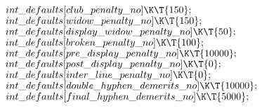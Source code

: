 ${}\index{int defaults+\\{int\_defaults}}\\{int\_defaults}[\index{club penalty no+\\{club\_penalty\_no}}\\{club\_penalty\_no}]\K\T{150};{}$\6
${}\index{int defaults+\\{int\_defaults}}\\{int\_defaults}[\index{widow penalty no+\\{widow\_penalty\_no}}\\{widow\_penalty\_no}]\K\T{150};{}$\6
${}\index{int defaults+\\{int\_defaults}}\\{int\_defaults}[\index{display widow penalty no+\\{display\_widow\_penalty\_no}}\\{display\_widow\_penalty\_no}]\K\T{50};{}$\6
${}\index{int defaults+\\{int\_defaults}}\\{int\_defaults}[\index{broken penalty no+\\{broken\_penalty\_no}}\\{broken\_penalty\_no}]\K\T{100};{}$\6
${}\index{int defaults+\\{int\_defaults}}\\{int\_defaults}[\index{pre display penalty no+\\{pre\_display\_penalty\_no}}\\{pre\_display\_penalty\_no}]\K\T{10000};{}$\6
${}\index{int defaults+\\{int\_defaults}}\\{int\_defaults}[\index{post display penalty no+\\{post\_display\_penalty\_no}}\\{post\_display\_penalty\_no}]\K\T{0};{}$\6
${}\index{int defaults+\\{int\_defaults}}\\{int\_defaults}[\index{inter line penalty no+\\{inter\_line\_penalty\_no}}\\{inter\_line\_penalty\_no}]\K\T{0};{}$\6
${}\index{int defaults+\\{int\_defaults}}\\{int\_defaults}[\index{double hyphen demerits no+\\{double\_hyphen\_demerits\_no}}\\{double\_hyphen\_demerits\_no}]\K\T{10000};{}$\6
${}\index{int defaults+\\{int\_defaults}}\\{int\_defaults}[\index{final hyphen demerits no+\\{final\_hyphen\_demerits\_no}}\\{final\_hyphen\_demerits\_no}]\K\T{5000};{}$\6
